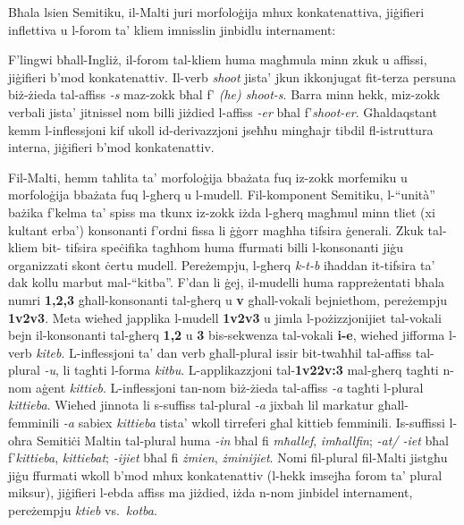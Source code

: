 \begin{multicols}{2}

Bħala lsien Semitiku, il-Malti juri morfoloġija mhux konkatenattiva, jiġifieri inflettiva u l-forom ta’ kliem imnisslin jinbidlu internament:

F’lingwi bħall-Ingliż, il-forom tal-kliem huma magħmula minn zkuk u affissi, jiġifieri b’mod konkatenattiv. Il-verb \emph{shoot} jista’ jkun ikkonjugat fit-terza persuna biż-żieda tal-affiss \emph{-s} maz-zokk bħal f’ \emph{(he) shoot-s}. Barra minn hekk, miz-zokk verbali jista’ jitnissel nom billi jiżdied l-affiss \emph{-er} bħal f’\emph{shoot-er}. Għaldaqstant kemm l-inflessjoni kif ukoll id-derivazzjoni jseħħu mingħajr tibdil fl-istruttura interna, jiġifieri b’mod konkatenattiv. 

Fil-Malti, hemm taħlita ta’ morfoloġija bbażata fuq iz-zokk morfemiku u morfoloġija bbażata fuq l-għerq u l-mudell. Fil-komponent Semitiku, l-``unità'' bażika f’kelma ta’ spiss ma tkunx iz-zokk iżda l-għerq magħmul minn tliet (xi kultant erba’) konsonanti f’ordni fissa li ġġorr magħha tifsira ġenerali. Zkuk tal-kliem bit- tifsira speċifika tagħhom huma ffurmati billi l-konsonanti jiġu organizzati skont ċertu mudell. Pereżempju, l-għerq \emph{k-t-b} iħaddan it-tifsira ta’ dak kollu marbut mal-``kitba''. F'dan li ġej, il-mudelli huma rappreżentati bħala numri \textbf{1,2,3} għall-konsonanti tal-għerq u \textbf{v} għall-vokali bejniethom, pereżempju \textbf{1v2v3}. Meta wieħed japplika l-mudell \textbf{1v2v3} u jimla l-pożizzjonijiet tal-vokali bejn il-konsonanti tal-għerq \textbf{1,2} u \textbf{3} bis-sekwenza tal-vokali \textbf{i-e}, wieħed jifforma l-verb \emph{kiteb}. L-inflessjoni ta’ dan verb għall-plural issir bit-twaħħil tal-affiss tal-plural \emph{-u}, li tagħti l-forma \emph{kitbu}. L-applikazzjoni tal-\textbf{1v22v:3} mal-għerq tagħti n-nom aġent \emph{kittieb}. L-inflessjoni tan-nom biż-żieda tal-affiss \emph{-a} tagħti l-plural \emph{kittieba}. Wieħed jinnota li s-suffiss tal-plural \emph{-a} jixbah lil markatur għall-femminili \emph{-a} sabiex \emph{kittieba} tista’ wkoll tirreferi għal kittieb femminili. Is-suffissi l-oħra Semitiċi Maltin tal-plural huma \emph{-in} bħal fi \emph{mħallef}, \emph{imħallfin}; \emph{-at/ -iet} bħal f’\emph{kittieba}, \emph{kittiebat}; \emph{-ijiet} bħal fi \emph{żmien}, \emph{żminijiet}. 
Nomi fil-plural fil-Malti jistgħu jiġu ffurmati wkoll b’mod mhux konkatenattiv (l-hekk imsejħa forom ta’ plural miksur), jiġifieri l-ebda affiss ma jiżdied, iżda n-nom jinbidel internament, pereżempju \emph{ktieb} vs.~\emph{kotba}.


\end{multicols}

